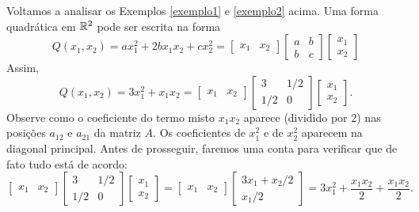 \documentclass[../livro.tex]{subfiles}
\begin{document}
\begin{example}
	Voltamos a analisar os Exemplos \ref{exemplo1} e \ref{exemplo2} acima. Uma forma quadrática em $\mathbb{R}^2$ pode ser escrita na forma
	\[
	Q(x_1, x_2) = a x_1^2 + 2 b x_1x_2 + cx_2^2 = 
	\begin{bmatrix}
	x_1 & x_2
	\end{bmatrix}
	\begin{bmatrix}
	a & b \\ b & c
	\end{bmatrix}
	\begin{bmatrix}
	x_1 \\ x_2
	\end{bmatrix}
	\] Assim,
	\[
	Q(x_1, x_2) = 3 x_1^2 + x_1x_2 = 
	\begin{bmatrix}
	x_1 & x_2
	\end{bmatrix}
	\begin{bmatrix}
	3 & 1/2 \\ 
	1/2 & 0
	\end{bmatrix}
	\begin{bmatrix}
	x_1 \\ x_2
	\end{bmatrix}.
	\] Observe como o coeficiente do termo misto $x_1 x_2$ aparece (dividido por $2$) nas posições $a_{12}$ e $a_{21}$ da matriz $A$. Os coeficientes de $x_1^2$ e de $x_2^2$ aparecem na diagonal principal. Antes de prosseguir, faremos uma conta para verificar que de fato tudo está de acordo:
	\[
	\begin{bmatrix}
	x_1 & x_2
	\end{bmatrix}
	\begin{bmatrix}
	3 & 1/2 \\ 
	1/2 & 0
	\end{bmatrix}
	\begin{bmatrix}
	x_1 \\ x_2
	\end{bmatrix} = 
	\begin{bmatrix}
	x_1 & x_2
	\end{bmatrix}
	\begin{bmatrix}
	3x_1 + x_2/2 \\
	x_1/2
	\end{bmatrix} = 3 x_1^2 + \frac{x_1x_2}{2} + \frac{x_1x_2}{2}.
	\]
	

\end{example}
\end{document}

